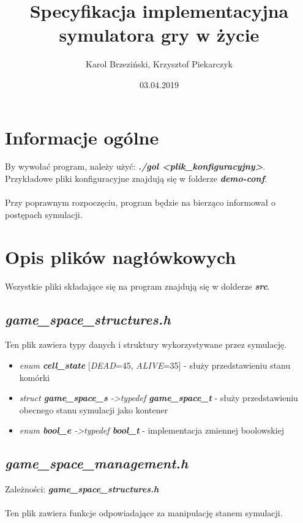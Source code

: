 \documentclass[12pt]{article}
\title{Specyfikacja implementacyjna symulatora gry w życie}
\author{Karol Brzeziński, Krzysztof Piekarczyk}
\date{03.04.2019}
\begin{document}
\maketitle


\section{Informacje ogólne}
By wywołać program, należy użyć: \textbf{\textit{./gol \textless plik\_konfiguracyjny\textgreater}}.
Przykładowe pliki konfiguracyjne znajdują się w folderze \textbf{\textit{demo-conf}}.\\
\\
Przy poprawnym rozpoczęciu, program będzie na bierząco informował o postępach symulacji.


\section{Opis plików nagłówkowych}
Wszystkie pliki składające się na program znajdują się w dolderze \textbf{\textit{src}}.

    \subsection{\textbf{\textit{game\_space\_structures.h}}}
        Ten plik zawiera typy danych i struktury wykorzystywane przez symulację.

        \begin{itemize}
            \item \textit{enum \textbf{cell\_state}} [\textit{DEAD}=45, \textit{ALIVE}=35] - służy przedstawieniu stanu komórki
            \item \textit{struct \textbf{game\_space\_s} -\textgreater typedef \textbf{game\_space\_t}} - służy przedstawieniu obecnego stanu symulacji jako kontener
            \item \textit{enum \textbf{bool\_e} -\textgreater typedef \textbf{bool\_t}} - implementacja zmiennej boolowskiej
        \end{itemize}


    \subsection{\textbf{\textit{game\_space\_management.h}}}
        Zależności: \textit{ \textbf{game\_space\_structures.h}}\\\\
        Ten plik zawiera funkcje odpowiadające za manipulację stanem symulacji.
\end{document}
